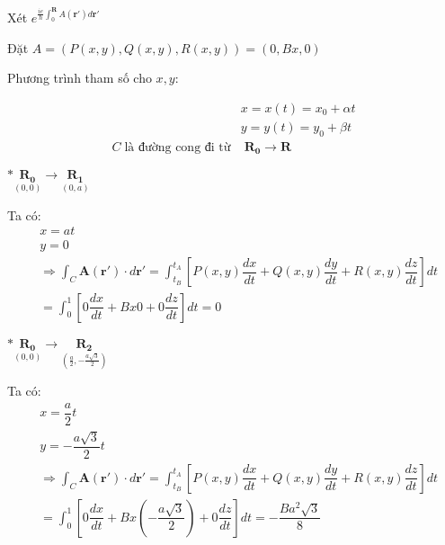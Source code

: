\documentclass{article}
\begin{document}
\noindent Xét $e^{\frac{ie}{\hbar}\int_{0}^{\mathbf{R}}A(\mathbf{r'})d\mathbf{r'}}$

\noindent Đặt $A = \left(P(x,y),Q(x,y),R(x,y)\right) = (0,Bx,0)$

\noindent Phương trình tham số cho $x,y$:

\begin{align*}
                                    & x = x(t) = x_0 + \alpha t              \\
                                    & y = y(t) = y_0 + \beta t               \\
    C \; \text{là đường cong đi từ} & \; \mathbf{R_0} \rightarrow \mathbf{R}
\end{align*}

\clearpage

\noindent $\ast \underset{(0,0)}{\mathbf{R_0}}  \longrightarrow \underset{(0,a)}{\mathbf{R_1}}$

Ta có:
\begin{align*}
     & x = at                                                                                                                                                                  \\
     & y = 0                                                                                                                                                                   \\
     & \Rightarrow \int_{C} \mathbf{A}(\mathbf{r'})\cdot d\mathbf{r'} =  \int_{t_B}^{t_A} \left[ P(x,y)\dfrac{dx}{dt} + Q(x,y)\dfrac{dy}{dt} + R(x,y)\dfrac{dz}{dt} \right] dt \\
     & = \int_{0}^{1} \left[ 0\dfrac{dx}{dt} + Bx0 + 0\dfrac{dz}{dt} \right] dt = 0
\end{align*}

\noindent $\ast \underset{(0,0)}{\mathbf{R_0}}  \longrightarrow \underset{(\frac{a}{2},-\frac{a\sqrt{3}}{2})}{\mathbf{R_2}}$

Ta có:
\begin{align*}
     & x = \dfrac{a}{2}t                                                                                                                                                       \\
     & y = -\dfrac{a\sqrt{3}}{2}t                                                                                                                                              \\
     & \Rightarrow \int_{C} \mathbf{A}(\mathbf{r'})\cdot d\mathbf{r'} =  \int_{t_B}^{t_A} \left[ P(x,y)\dfrac{dx}{dt} + Q(x,y)\dfrac{dy}{dt} + R(x,y)\dfrac{dz}{dt} \right] dt \\
     & = \int_{0}^{1} \left[ 0\dfrac{dx}{dt} + Bx\left(-\dfrac{a\sqrt{3}}{2}\right) + 0\dfrac{dz}{dt} \right] dt = -\dfrac{Ba^2\sqrt{3}}{8}
\end{align*}
\end{document}
